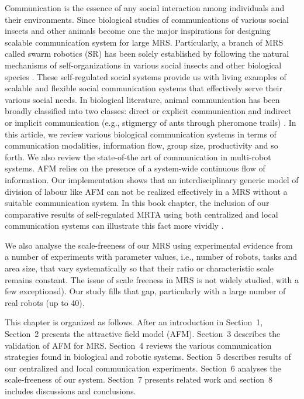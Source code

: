 \documentclass[10pt,a4paper]{article}
\begin{document}
Communication is the essence of any social interaction among individuals and their environments. Since biological studies of communications of various social insects and other animals become one the major inspirations for designing scalable communication system for large MRS. Particularly, a branch of MRS called swarm robotics (SR) has been solely established by following the natural mechanisms of self-organizations in various social insects and other biological species \cite{Bonabeau+1999}. These self-regulated social systems provide us with living examples of scalable and flexible social communication systems that effectively serve their various social needs. In biological literature, animal communication has been broadly classified into two classes: direct or explicit communication and indirect or implicit communication (e.g., stigmergy of ants through pheromone trails) \cite{Balch+1994comm,Labella2007}. In this article, we review various biological communication systems in terms of communication modalities, information flow, group size, productivity and so forth. We also review the state-of-the art of communication in multi-robot systems. 
AFM relies on the presence of a system-wide continuous flow of information. Our implementation shows that an interdisciplinary generic model of division of labour like AFM can not be realized effectively in a MRS without a suitable communication system. In this book chapter, the inclusion of our comparative results of self-regulated MRTA using both centralized and local communication systems can illustrate this fact more vividly \cite{Sarker+2010iros}.

We also analyse the scale-freeness of our MRS using experimental evidence from a number of experiments with parameter values, i.e., number of robots, tasks and area size, that vary systematically so that their ratio or characteristic scale remains constant. The issue of scale freeness in MRS is not widely studied, with a few exceptionsd\cite{Gustafson+2006}). Our study fills that gap, particularly with a large number of real robots (up to 40).

This chapter is organized as follows. After an introduction in Section~1, Section~2 presents the attractive field model (AFM). Section~3 describes the validation of AFM for MRS. Section~4 reviews the various communication strategies found in biological and robotic systems. Section~5 describes results of our centralized and local communication experiments. Section~6 analyses the scale-freeness of our system. Section~7 presents related work and section~8 includes discussions and conclusions.


\end{document}
